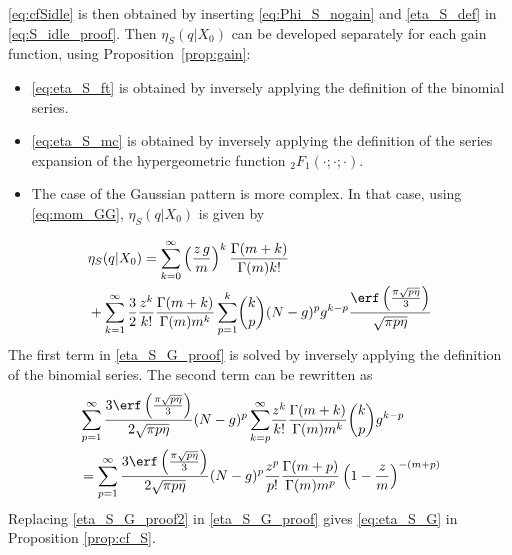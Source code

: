 {\eqref{eq:cfSidle} is then obtained by inserting  \eqref{eq:Phi_S_nogain} and \eqref{eta_S_def} in \eqref{eq:S_idle_proof}. Then $\eta_S(q|X_0)$ can be developed separately for each gain function, using Proposition~\ref{prop:gain}:
\begin{itemize}
    \item \eqref{eq:eta_S_ft} is obtained by inversely applying the definition of the binomial series.
    \item \eqref{eq:eta_S_mc} is obtained by inversely applying the definition of the series expansion of the hypergeometric function ${}_2F_1(\cdot;\cdot;\cdot)$.
    \item The case of the Gaussian pattern is more complex. In that case, using \eqref{eq:mom_GG}, $\eta_S(q|X_0)$ is given by
\end{itemize}
    {\small
    \begin{equation}\label{eta_S_G_proof}
    \begin{split}
        &\eta_S(q|X_0) = \sum\limits_{k = 0}^\infty \left(\frac{z\,g}{m}\right)^k  \frac{\Gamma(m+k)}{\Gamma(m) k!}\\
        &+ \sum\limits_{k = 1}^\infty \frac{3}{2}\frac{z^k}{k!} \frac{\Gamma(m+k)}{\Gamma(m) m^k} \sum\limits_{p = 1}^k \! \binom{k}{p} (N-g)^p g^{k-p} \frac{\erf\left(\tfrac{\pi \sqrt{p \eta}}{3}\right)}{\sqrt{\pi p \eta}}
    \end{split}
    \end{equation}}
The first term in \eqref{eta_S_G_proof} is solved by inversely applying the definition of the binomial series. The second term can be rewritten as
\begin{align}\label{eta_S_G_proof2}
    \begin{split}
        &\sum\limits_{p=1}^\infty  \frac{3\erf\left(\tfrac{\pi \sqrt{p \eta}}{3}\right)}{2 \sqrt{\pi p \eta}} (N-g)^p \sum\limits_{k=p}^\infty \!\frac{z^k}{k!} \frac{\Gamma(m+k) }{\Gamma(m) m^k } \binom{k}{p} g^{k-p}\\
        &= \sum\limits_{p=1}^\infty  \frac{3\erf\left(\tfrac{\pi \sqrt{p \eta}}{3}\right)}{2 \sqrt{\pi p \eta}} (N-g)^p \frac{z^p}{p!}\frac{ \Gamma(m+p) }{\Gamma(m) m^p } \left(1-\frac{z}{m}\right)^{-(m+p)}
    \end{split}
\end{align}
Replacing \eqref{eta_S_G_proof2} in \eqref{eta_S_G_proof} gives \eqref{eq:eta_S_G} in Proposition \ref{prop:cf_S}.
    
}
